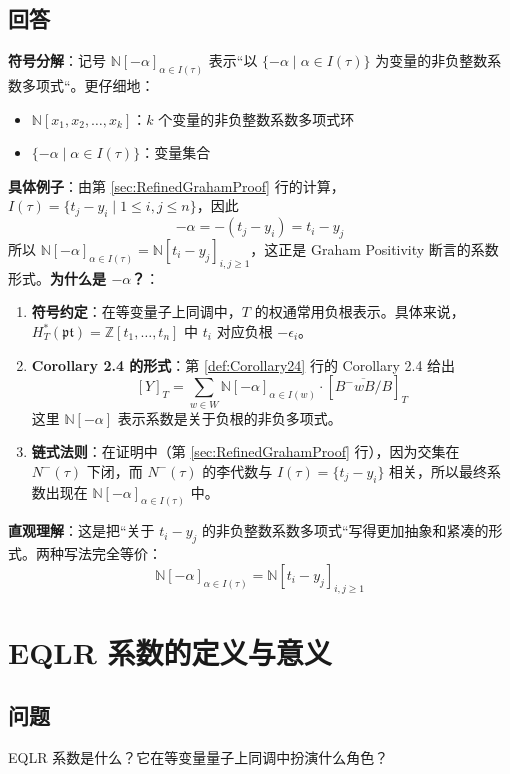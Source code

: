 \subsection{回答}
\textbf{符号分解}：记号 $\mathbb{N}[-\alpha]_{\alpha \in I(\tau)}$ 表示``以 $\{-\alpha \mid \alpha \in I(\tau)\}$ 为变量的非负整数系数多项式``。更仔细地：
\begin{itemize}
\item $\mathbb{N}[x_1, x_2, \ldots, x_k]$：$k$ 个变量的非负整数系数多项式环
\item $\{-\alpha \mid \alpha \in I(\tau)\}$：变量集合
\end{itemize}

\textbf{具体例子}：由第 \ref{sec:RefinedGrahamProof} 行的计算，$I(\tau) = \{t_j - y_i \mid 1 \leq i,j \leq n\}$，因此$$-\alpha = -(t_j - y_i) = t_i - y_j$$所以 $\mathbb{N}[-\alpha]_{\alpha \in I(\tau)} = \mathbb{N}[t_i - y_j]_{i,j \geq 1}$，这正是 Graham Positivity 断言的系数形式。\textbf{为什么是 $-\alpha$？}：
\begin{enumerate}
\item \textbf{符号约定}：在等变量子上同调中，$T$ 的权通常用负根表示。具体来说，$H_T^*(\mathfrak{pt}) = \mathbb{Z}[t_1, \ldots, t_n]$ 中 $t_i$ 对应负根 $-\epsilon_i$。
\item \textbf{Corollary 2.4 的形式}：第 \ref{def:Corollary24} 行的 Corollary 2.4 给出
$$[Y]_T = \sum_{w \in W} \mathbb{N}[-\alpha]_{\alpha \in I(w)} \cdot [\overline{B^-wB/B}]_T$$
这里 $\mathbb{N}[-\alpha]$ 表示系数是关于负根的非负多项式。
\item \textbf{链式法则}：在证明中（第 \ref{sec:RefinedGrahamProof} 行），因为交集在 $N^-(\tau)$ 下闭，而 $N^-(\tau)$ 的李代数与 $I(\tau) = \{t_j - y_i\}$ 相关，所以最终系数出现在 $\mathbb{N}[-\alpha]_{\alpha \in I(\tau)}$ 中。
\end{enumerate}

\textbf{直观理解}：这是把``关于 $t_i - y_j$ 的非负整数系数多项式``写得更加抽象和紧凑的形式。两种写法完全等价：$$\mathbb{N}[-\alpha]_{\alpha \in I(\tau)} = \mathbb{N}[t_i - y_j]_{i,j \geq 1}$$
\section{EQLR 系数的定义与意义}\label{sec:EQLR-Definition}
\subsection{问题}
EQLR 系数是什么？它在等变量量子上同调中扮演什么角色？
